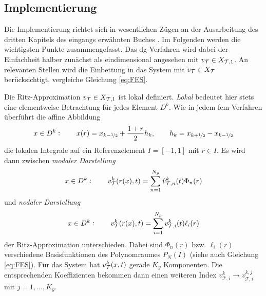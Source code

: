 \subsection{Implementierung} \label{sec:implementierung}
Die Implementierung richtet sich in wesentlichen Zügen an der Ausarbeitung des dritten Kapitels des eingangs erwähnten Buches \cite{buch}. Im Folgenden werden die wichtigsten Punkte zusammengefasst. Das \ac{dg}-Verfahren wird dabei der Einfachheit halber zunächst als eindimensional angesehen mit $v_{\mathcal{T}} \in X_{\mathcal{T},1}$. An relevanten Stellen wird die Einbettung in das System mit $v_{\mathcal{T}} \in X_{\mathcal{T}}$ berücksichtigt, vergleiche Gleichung \eqref{eq:FES}.

Die Ritz-Approximation $v_{\mathcal{T}} \in X_{\mathcal{T},1}$ ist lokal definiert. \emph{Lokal} bedeutet hier stets eine elementweise Betrachtung für jedes Element $D^k$. Wie in jedem \ac{fem}-Verfahren überführt die affine Abbildung
\begin{equation}
  x\in D^k : \qquad x(r) = x_{k-\nicefrac{1}{2}} + \frac{1+r}{2}h_k, \qquad h_k=x_{k+\nicefrac{1}{2}} - x_{k-\nicefrac{1}{2}}
  \label{eq:affmap}
\end{equation}
die lokalen Integrale auf ein Referenzelement $I=[-1,1]$ mit $r\in I$.
Es wird dann zwischen \emph{modaler Darstellung}
\begin{align*}
  x\in D^k : \qquad v_{\mathcal{T}}^k(r(x),t) = \sum_{n=1}^{N_p}\hat{v}_{\mathcal{T},n}^k(t) \Phi_n(r)
\end{align*}
und \emph{nodaler Darstellung}
\begin{align}
  x\in D^k : \qquad v_{\mathcal{T}}^k(r(x),t) = \sum_{i=1}^{N_p} v_{\mathcal{T},i}^k(t)\ell_i(r)
  \label{eq:nodal}
\end{align}
der Ritz-Approximation unterschieden. Dabei sind $\Phi_n(r)$ bzw. $\ell_i(r)$ verschiedene Basisfunktionen des Polynomraumes $P_N(I)$ (siehe auch Gleichung \eqref{eq:FES}). Für das System hat $v_{\mathcal{T}}^k(x,t)$ gerade $K_y$ Komponenten. Die entsprechenden Koeffizienten bekommen dann einen weiteren Index $v_{\mathcal{T},i}^k \rightarrow v_{\mathcal{T},i}^{k,j}$ mit $j=1,\dots,K_y$.

